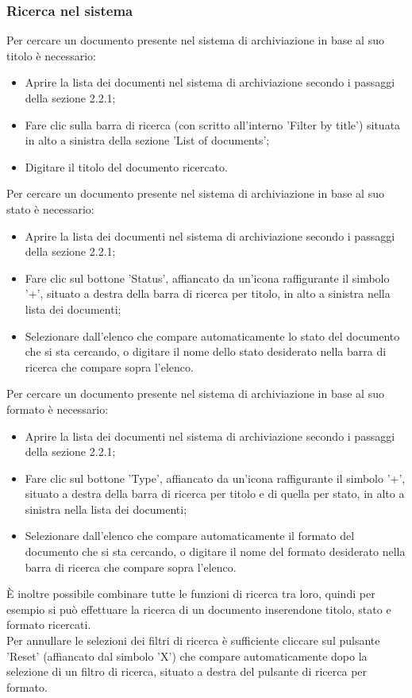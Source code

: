 \documentclass[10pt, a4paper]{article}
\begin{document}
\subsubsection{Ricerca nel sistema}
Per cercare un documento presente nel sistema di archiviazione in base al suo titolo è necessario:
\begin{itemize}
    \item Aprire la lista dei documenti nel sistema di archiviazione secondo i passaggi della sezione 2.2.1;
    \item Fare clic sulla barra di ricerca (con scritto all'interno 'Filter by title') situata in alto a sinistra della sezione 'List of documents';
    \item Digitare il titolo del documento ricercato.
\end{itemize}
Per cercare un documento presente nel sistema di archiviazione in base al suo stato è necessario:
\begin{itemize}
    \item Aprire la lista dei documenti nel sistema di archiviazione secondo i passaggi della sezione 2.2.1;
    \item Fare clic sul bottone 'Status', affiancato da un'icona raffigurante il simbolo '+', situato a destra della barra di ricerca per titolo, in alto a sinistra nella lista dei documenti;
    \item Selezionare dall'elenco che compare automaticamente lo stato del documento che si sta cercando, o digitare il nome dello stato desiderato nella barra di ricerca che compare sopra l'elenco.
\end{itemize}
Per cercare un documento presente nel sistema di archiviazione in base al suo formato è necessario:
\begin{itemize}
    \item Aprire la lista dei documenti nel sistema di archiviazione secondo i passaggi della sezione 2.2.1;
    \item Fare clic sul bottone 'Type', affiancato da un'icona raffigurante il simbolo '+', situato a destra della barra di ricerca per titolo e di quella per stato, in alto a sinistra nella lista dei documenti;
    \item Selezionare dall'elenco che compare automaticamente il formato del documento che si sta cercando, o digitare il nome del formato desiderato nella barra di ricerca che compare sopra l'elenco.
\end{itemize}
È inoltre possibile combinare tutte le funzioni di ricerca tra loro, quindi per esempio si può effettuare la ricerca di un documento inserendone titolo, stato e formato ricercati. \\ Per annullare le selezioni dei filtri di ricerca è sufficiente cliccare sul pulsante 'Reset' (affiancato dal simbolo 'X') che compare automaticamente dopo la selezione di un filtro di ricerca, situato a destra del pulsante di ricerca per formato.
\end{document}
